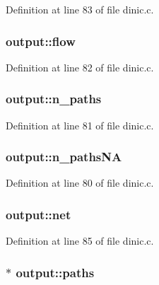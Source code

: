 Definition at line 83 of file dinic.c.

\hypertarget{structoutput_addc7c459e69ce4a8a5c6199e14a6ca9d}{
\subsubsection[{flow}]{ {\bf output::flow}}}
\label{structoutput_addc7c459e69ce4a8a5c6199e14a6ca9d}


Definition at line 82 of file dinic.c.

\hypertarget{structoutput_aa980d6936e4721676b8a33fd8b304322}{
\subsubsection[{n\_\-paths}]{ {\bf output::n\_\-paths}}}
\label{structoutput_aa980d6936e4721676b8a33fd8b304322}


Definition at line 81 of file dinic.c.

\hypertarget{structoutput_ad060ae8bd6f94c7aba0642813120ab4e}{
\subsubsection[{n\_\-pathsNA}]{ {\bf output::n\_\-pathsNA}}}
\label{structoutput_ad060ae8bd6f94c7aba0642813120ab4e}


Definition at line 80 of file dinic.c.

\hypertarget{structoutput_ada4c12dc3b04413cfac919d1225b5bdf}{
\subsubsection[{net}]{ {\bf output::net}}}
\label{structoutput_ada4c12dc3b04413cfac919d1225b5bdf}


Definition at line 85 of file dinic.c.

\hypertarget{structoutput_af94f35ded05674483a752d14b5bf8688}{
\subsubsection[{paths}]{$\ast$ {\bf output::paths}}}
\label{structoutput_af94f35ded05674483a752d14b5bf8688}


